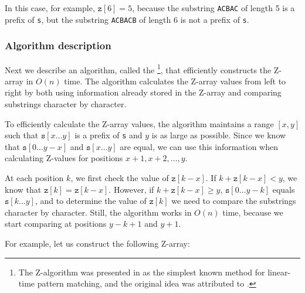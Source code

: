 In this case, for example, $\texttt{z}[6]=5$,
because the substring \texttt{ACBAC} of length 5
is a prefix of \texttt{s},
but the substring \texttt{ACBACB} of length 6
is not a prefix of \texttt{s}.

\subsubsection*{Algorithm description}

Next we describe an algorithm,
called the \footnote{The Z-algorithm
was presented in \cite{gus97} as the simplest known
method for linear-time pattern matching, and the original idea
was attributed to \cite{mai84}.},
that efficiently constructs the Z-array in $O(n)$ time.
The algorithm calculates the Z-array values
from left to right by both using information
already stored in the Z-array and comparing substrings
character by character.

To efficiently calculate the Z-array values,
the algorithm maintains a range $[x,y]$ such that
$\texttt{s}[x \ldots y]$ is a prefix of \texttt{s}
and $y$ is as large as possible.
Since we know that $\texttt{s}[0 \ldots y-x]$
and $\texttt{s}[x \ldots y]$ are equal,
we can use this information when calculating
Z-values for positions $x+1,x+2,\ldots,y$.

At each position $k$, we first
check the value of $\texttt{z}[k-x]$.
If $k+\texttt{z}[k-x]<y$, we know that $\texttt{z}[k]=\texttt{z}[k-x]$.
However, if $k+\texttt{z}[k-x] \ge y$,
$\texttt{s}[0 \ldots y-k]$ equals
$\texttt{s}[k \ldots y]$, and to determine the
value of $\texttt{z}[k]$ we need to compare
the substrings character by character.
Still, the algorithm works in $O(n)$ time,
because we start comparing at positions
$y-k+1$ and $y+1$.

For example, let us construct the following Z-array:

